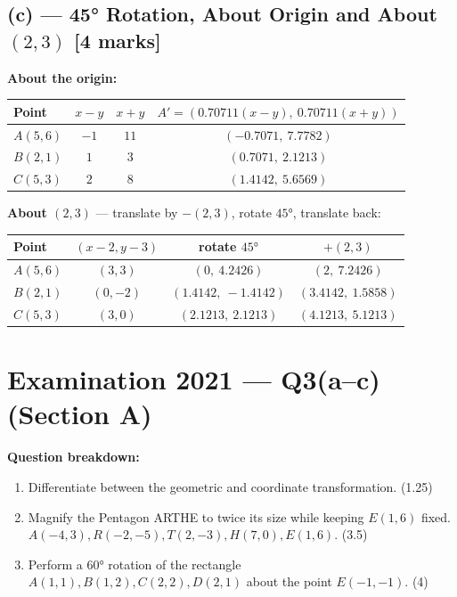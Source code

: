 \documentclass[12pt, a4paper]{article}
\newenvironment{solutionbox}{\begin{mdframed}[style=solutionframe]}{\end{mdframed}}
\begin{document}
\subsection*{(c) --- 45° Rotation, About Origin and About $(2,3)$ [4 marks]}
\begin{solutionbox}
\textbf{About the origin:}
\begin{center}
\begin{tabular}{lccc}
\toprule
Point & $x-y$ & $x+y$ & $A'=(0.70711(x-y),\ 0.70711(x+y))$ \\
\midrule
$A(5,6)$ & $-1$ & $11$ & $(-0.7071,\ 7.7782)$ \\
$B(2,1)$ & $1$ & $3$ & $(0.7071,\ 2.1213)$ \\
$C(5,3)$ & $2$ & $8$ & $(1.4142,\ 5.6569)$ \\
\bottomrule
\end{tabular}
\end{center}
\end{solutionbox}
\begin{solutionbox}
\textbf{About $(2,3)$} --- translate by $-(2,3)$, rotate $45°$, translate back:
\begin{center}
\begin{tabular}{lccc}
\toprule
Point & $(x-2,y-3)$ & rotate $45°$ & $+(2,3)$ \\
\midrule
$A(5,6)$ & $(3,3)$ & $(0,\ 4.2426)$ & $(2,\ 7.2426)$ \\
$B(2,1)$ & $(0,-2)$ & $(1.4142,\ -1.4142)$ & $(3.4142,\ 1.5858)$ \\
$C(5,3)$ & $(3,0)$ & $(2.1213,\ 2.1213)$ & $(4.1213,\ 5.1213)$ \\
\bottomrule
\end{tabular}
\end{center}
\end{solutionbox}

\section{Examination 2021 --- Q3(a--c) (Section A)}
\begin{solutionbox}
\textbf{Question breakdown:}
\begin{enumerate}[noitemsep]
  \item[(a)] Differentiate between the geometric and coordinate transformation. (1.25)
  \item[(b)] Magnify the Pentagon ARTHE to twice its size while keeping $E(1,6)$ fixed. $A(-4,3), R(-2,-5), T(2,-3), H(7,0), E(1,6)$. (3.5)
  \item[(c)] Perform a $60°$ rotation of the rectangle $A(1,1), B(1,2), C(2,2), D(2,1)$ about the point $E(-1,-1)$. (4)
\end{enumerate}
\end{solutionbox}
\end{document}
